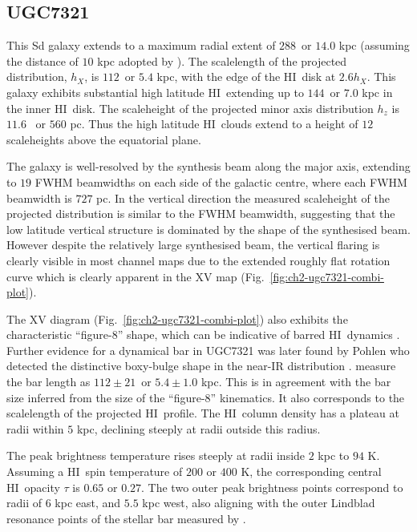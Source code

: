 \documentclass[traditabstract]{aa} %
\newcommand\HI{H{\small I}}
\begin{document}
\subsection{UGC7321}

This Sd galaxy extends to a maximum radial extent of $288$\arcsec\ or
$14.0$ kpc (assuming the distance of $10$ kpc adopted by
\citet{um2003}). The scalelength of the projected distribution,
$h_X$, is $112$\arcsec\ or $5.4$ kpc, with the edge of the \HI\ disk at
$2.6h_X$. This galaxy exhibits substantial high latitude \HI\
extending up to $144$\arcsec\ or $7.0$ kpc in the inner \HI\ disk. The
scaleheight of the projected minor axis distribution $h_z$ is $11.6$
\arcsec\ or $560$ pc. Thus the high latitude \HI\ clouds extend to a
height of $12$ scaleheights above the equatorial plane.

The galaxy is well-resolved by the synthesis beam along the major
axis, extending to $19$ FWHM beamwidths on each side of the galactic
centre, where each FWHM beamwidth is $727$ pc. In the vertical
direction the measured scaleheight of the projected distribution is
similar to the FWHM beamwidth, suggesting that the low latitude
vertical structure is dominated by the shape of the synthesised beam.
However despite the relatively large synthesised beam, the vertical
flaring is clearly visible in most channel maps due to the 
extended roughly flat
rotation curve which is clearly apparent in the XV map
(Fig.~\ref{fig:ch2-ugc7321-combi-plot}).

The XV diagram (Fig.~\ref{fig:ch2-ugc7321-combi-plot}) also exhibits
the characteristic ``figure-8'' shape, which can be indicative of
barred \HI\ dynamics \citep{km1995,bf1999,ab1999,athanassoula2000}.
Further evidence for a dynamical bar in UGC7321 was later found by
Pohlen who detected the distinctive boxy-bulge shape in the
near-IR distribution \citep{pbld2003}. \citet{pbld2003} measure the
bar length as $112\pm21$\arcsec\ or $5.4\pm1.0$ kpc. This is in
agreement with the bar size inferred from the size of the ``figure-8''
kinematics. It also corresponds to the scalelength of the
projected \HI\ profile. The \HI\ column density has a plateau at
radii within $5$ kpc, declining steeply at radii outside this radius.

The peak brightness temperature rises steeply at radii inside $2$ kpc
to $94$ K. Assuming a \HI\ spin temperature of $200$ or $400$ K, the
corresponding central \HI\ opacity $\tau$ is $0.65$ or $0.27$. The two
outer peak brightness points correspond to radii of $6$ kpc east, and
$5.5$ kpc west, also aligning with the outer Lindblad resonance points
of the stellar bar measured by \citet{pbld2003}.
\end{document}
